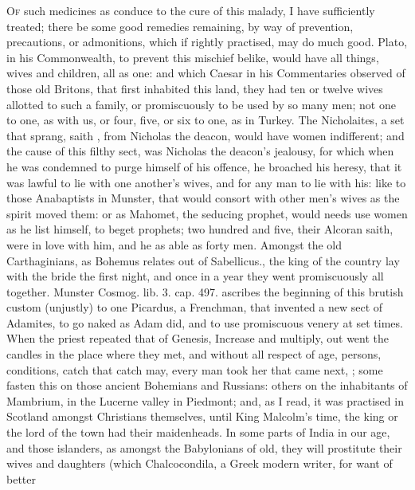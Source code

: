 \lettrine{O}{f} such medicines as conduce to the cure of this malady, I have
sufficiently treated; there be some good remedies remaining, by way of
prevention, precautions, or admonitions, which if rightly practised,
may do much good. Plato, in his Commonwealth, to prevent this mischief
belike, would have all things, wives and children, all as one: and
which Caesar in his Commentaries observed of those old Britons, that
first inhabited this land, they had ten or twelve wives allotted to
such a family, or promiscuously to be used by so many men; not one to
one, as with us, or four, five, or six to one, as in Turkey. The
Nicholaites, a set that sprang, saith \Austin{}, from Nicholas the
deacon, would have women indifferent; and the cause of this filthy
sect, was Nicholas the deacon's jealousy, for which when he was
condemned to purge himself of his offence, he broached his heresy, that
it was lawful to lie with one another's wives, and for any man to lie
with his: like to those Anabaptists in Munster, that would
consort with other men's wives as the spirit moved them: or as
Mahomet, the seducing prophet, would needs use women as he list
himself, to beget prophets; two hundred and five, their Alcoran saith,
were in love with him, and he as able as forty men. Amongst the
old Carthaginians, as Bohemus relates out of Sabellicus., the
king of the country lay with the bride the first night, and once in a
year they went promiscuously all together. Munster Cosmog. lib. 3. cap.
497. ascribes the beginning of this brutish custom (unjustly) to one
Picardus, a Frenchman, that invented a new sect of Adamites, to go
naked as Adam did, and to use promiscuous venery at set times. When the
priest repeated that of Genesis, Increase and multiply, out went
the candles in the place where they met, and without all respect of
age, persons, conditions, catch that catch may, every man took her that
came next, \etc{}; some fasten this on those ancient Bohemians and
Russians: others on the inhabitants of Mambrium, in the Lucerne
valley in Piedmont; and, as I read, it was practised in Scotland
amongst Christians themselves, until King Malcolm's time, the king or
the lord of the town had their maidenheads. In some parts of
India in our age, and those
islanders, as amongst the Babylonians
of old, they will prostitute their wives and daughters
(which Chalcocondila, a Greek modern writer, for want of better
